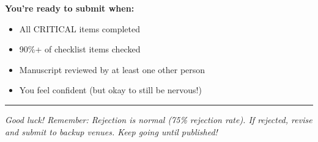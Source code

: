 \documentclass[11pt]{article}
\begin{document}
\vspace{1em}
\textbf{You're ready to submit when:}
\begin{itemize}
    \item All \textcolor{urgent}{CRITICAL} items completed
    \item 90\%+ of checklist items checked
    \item Manuscript reviewed by at least one other person
    \item You feel confident (but okay to still be nervous!)
\end{itemize}

\vspace{2em}
\hrule
\vspace{0.5em}
\textit{Good luck! Remember: Rejection is normal (75\% rejection rate). If rejected, revise and submit to backup venues. Keep going until published!}
\end{document}
